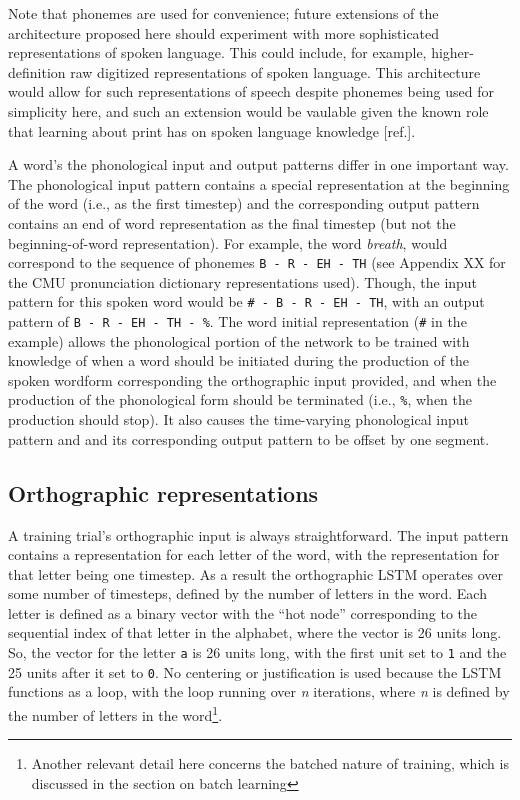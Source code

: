 \documentclass[
  american,
  man,floatsintext]{apa6}
\begin{document}
Note that phonemes are used for convenience; future extensions of the architecture proposed here should experiment with more sophisticated representations of spoken language. This could include, for example, higher-definition raw digitized representations of spoken language. This architecture would allow for such representations of speech despite phonemes being used for simplicity here, and such an extension would be vaulable given the known role that learning about print has on spoken language knowledge {[}ref.{]}.

A word's the phonological input and output patterns differ in one important way. The phonological input pattern contains a special representation at the beginning of the word (i.e., as the first timestep) and the corresponding output pattern contains an end of word representation as the final timestep (but not the beginning-of-word representation). For example, the word \emph{breath}, would correspond to the sequence of phonemes \texttt{B\ -\ R\ -\ EH\ -\ TH} (see Appendix XX for the CMU pronunciation dictionary representations used). Though, the input pattern for this spoken word would be \texttt{\#\ -\ B\ -\ R\ -\ EH\ -\ TH}, with an output pattern of \texttt{B\ -\ R\ -\ EH\ -\ TH\ -\ \%}. The word initial representation (\texttt{\#} in the example) allows the phonological portion of the network to be trained with knowledge of when a word should be initiated during the production of the spoken wordform corresponding the orthographic input provided, and when the production of the phonological form should be terminated (i.e., \texttt{\%}, when the production should stop). It also causes the time-varying phonological input pattern and and its corresponding output pattern to be offset by one segment.

\hypertarget{orthographic-representations}{%
\subsection{Orthographic representations}\label{orthographic-representations}}

A training trial's orthographic input is always straightforward. The input pattern contains a representation for each letter of the word, with the representation for that letter being one timestep. As a result the orthographic LSTM operates over some number of timesteps, defined by the number of letters in the word. Each letter is defined as a binary vector with the ``hot node'' corresponding to the sequential index of that letter in the alphabet, where the vector is 26 units long. So, the vector for the letter \texttt{a} is 26 units long, with the first unit set to \texttt{1} and the 25 units after it set to \texttt{0}. No centering or justification is used because the LSTM functions as a loop, with the loop running over \emph{n} iterations, where \emph{n} is defined by the number of letters in the word\footnote{Another relevant detail here concerns the batched nature of training, which is discussed in the section on batch learning}.
\end{document}
